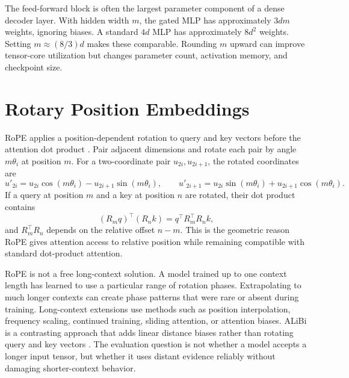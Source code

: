 The feed-forward block is often the largest parameter component of a dense decoder layer. With hidden width $m$, the gated MLP has approximately $3dm$ weights, ignoring biases. A standard $4d$ MLP has approximately $8d^2$ weights. Setting $m\approx (8/3)d$ makes these comparable. Rounding $m$ upward can improve tensor-core utilization but changes parameter count, activation memory, and checkpoint size.

\section{Rotary Position Embeddings}
\label{sec:llama-rope}

RoPE applies a position-dependent rotation to query and key vectors before the attention dot product \cite{su2021roformer}. Pair adjacent dimensions and rotate each pair by angle $m\theta_i$ at position $m$. For a two-coordinate pair $u_{2i},u_{2i+1}$, the rotated coordinates are
\begin{equation}
  u'_{2i} = u_{2i}\cos(m\theta_i) - u_{2i+1}\sin(m\theta_i),
  \qquad
  u'_{2i+1} = u_{2i}\sin(m\theta_i) + u_{2i+1}\cos(m\theta_i).
\end{equation}
If a query at position $m$ and a key at position $n$ are rotated, their dot product contains
\begin{equation}
  {(R_m q)}^{\top}(R_n k)
  = q^{\top}R_m^{\top}R_n k,
\end{equation}
and $R_m^{\top}R_n$ depends on the relative offset $n-m$. This is the geometric reason RoPE gives attention access to relative position while remaining compatible with standard dot-product attention.

RoPE is not a free long-context solution. A model trained up to one context length has learned to use a particular range of rotation phases. Extrapolating to much longer contexts can create phase patterns that were rare or absent during training. Long-context extensions use methods such as position interpolation, frequency scaling, continued training, sliding attention, or attention biases. ALiBi is a contrasting approach that adds linear distance biases rather than rotating query and key vectors \cite{press2021train}. The evaluation question is not whether a model accepts a longer input tensor, but whether it uses distant evidence reliably without damaging shorter-context behavior.

